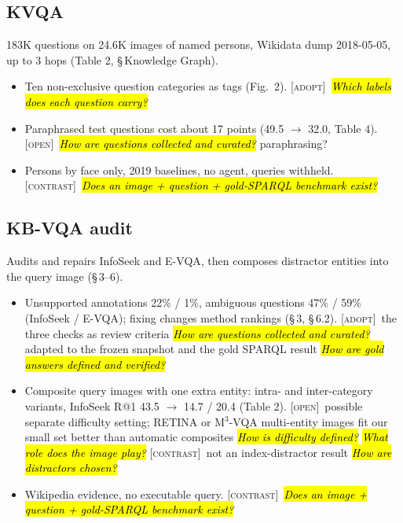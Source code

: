 \documentclass[10pt,a4paper]{article}
\newcommand{\adopt}{\textsc{[adopt]}}
\newcommand{\contrast}{\textsc{[contrast]}}
\newcommand{\open}{\textsc{[open]}}
\newcommand{\q}[1]{\hl{\footnotesize\itshape #1}}
\begin{document}
\subsection*{KVQA \cite{shah2019kvqa}}
183K questions on 24.6K images of named persons, Wikidata dump
2018-05-05, up to 3 hops (Table 2, \S\,Knowledge Graph).
\begin{itemize}
  \item Ten non-exclusive question categories as tags (Fig.~2).
    \adopt\ \q{Which labels does each question carry?}
  \item Paraphrased test questions cost about 17 points (49.5 $\to$
    32.0, Table 4). \open\ \q{How are questions collected and
    curated?} paraphrasing?
  \item Persons by face only, 2019 baselines, no agent, queries
    withheld. \contrast\ \q{Does an image + question + gold-SPARQL
    benchmark exist?}
\end{itemize}

\subsection*{KB-VQA audit \cite{ma2026identifying}}
Audits and repairs InfoSeek and E-VQA, then composes distractor
entities into the query image (\S\,3--6).
\begin{itemize}
  \item Unsupported annotations 22\% / 1\%, ambiguous questions
    47\% / 59\% (InfoSeek / E-VQA); fixing changes method rankings
    (\S\,3, \S\,6.2). \adopt\ the three checks as review criteria
    \q{How are questions collected and curated?} adapted to the frozen
    snapshot and the gold SPARQL result \q{How are gold answers
    defined and verified?}
  \item Composite query images with one extra entity: intra- and
    inter-category variants, InfoSeek R@1 43.5 $\to$ 14.7 / 20.4
    (Table 2). \open\ possible separate difficulty setting; RETINA or
    M$^3$-VQA multi-entity images fit our small set better than
    automatic composites \q{How is difficulty defined?} \q{What role
    does the image play?} \contrast\ not an index-distractor result
    \q{How are distractors chosen?}
  \item Wikipedia evidence, no executable query. \contrast\
    \q{Does an image + question + gold-SPARQL benchmark exist?}
\end{itemize}
\end{document}
